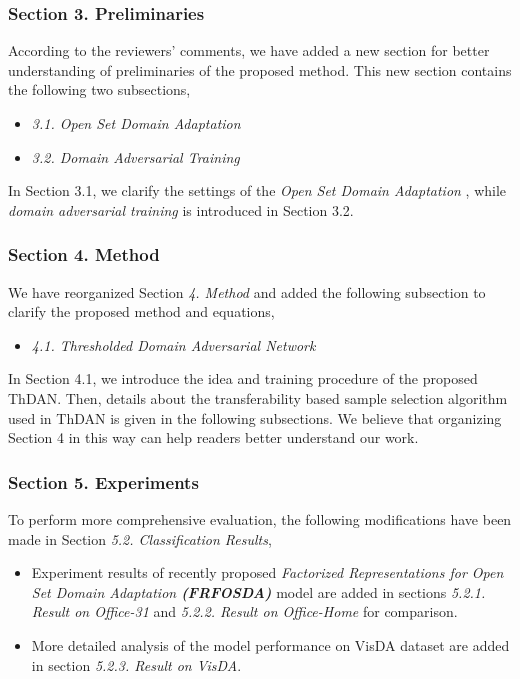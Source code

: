 

\newpage
\subsubsection*{{\textbf{Section 3. Preliminaries}}}
According to the reviewers' comments, we have added a new section for better understanding of preliminaries of the proposed method. 
This new section contains the following two subsections,
\begin{itemize}[topsep=0pt]
    \small
    \item \textit{3.1. Open Set Domain Adaptation}
    \item \textit{3.2. Domain Adversarial Training}
\end{itemize}
In Section 3.1, we clarify the settings of the \textit{Open Set Domain Adaptation} \cite{OpensetDA-bp}, while \textit{domain adversarial training} \cite{DomainAdversrialNetwork} is introduced in Section 3.2.


\subsubsection*{{\textbf{Section 4. Method }}}
We have reorganized Section \textit{4. Method} and added the following subsection to clarify the proposed method and equations,
\begin{itemize}[topsep=0pt]
    \small
    \item \textit{4.1. Thresholded Domain Adversarial Network}
\end{itemize}
In Section 4.1, we introduce the idea and training procedure of the proposed ThDAN.
Then, details about the transferability based sample selection algorithm used in ThDAN is given in the following subsections.
We believe that organizing Section 4 in this way can help readers better understand our work.

\subsubsection*{{\textbf{Section 5. Experiments}}}
To perform more comprehensive evaluation, the following modifications have been made in Section \textit{5.2. Classification Results},
\begin{itemize}[topsep=0pt]
    \small
    \item Experiment results of recently proposed \textit{Factorized Representations for Open Set Domain Adaptation \textbf{(FRFOSDA)}} model \cite{PDA-fac} are added in sections \textit{5.2.1. Result on Office-31} and \textit{5.2.2. Result on Office-Home} for comparison.
    \item More detailed analysis of the model performance on VisDA dataset are added in section \textit{5.2.3. Result on VisDA}.
\end{itemize}

